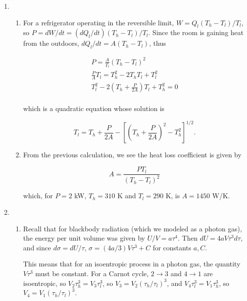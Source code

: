 \documentclass{article}
\begin{document}
\begin{enumerate}
\begin{enumerate}
	\end{enumerate}

	\item

	\begin{enumerate}

		\item

		For a refrigerator operating in the reversible limit, $W = Q_l (T_h - T_l)/T_l$, so $P = dW/dt = (dQ_l/dt) (T_h - T_l)/T_l$. Since the room is gaining heat from the outdoors, $dQ_l/dt = A(T_h - T_l)$, thus

		\begin{gather*}
		P = \frac{A}{T_l} (T_h-T_l)^2 \\
		\frac{P}{A}T_l = T_h^2 - 2T_h T_l + T_l^2 \\
		T_l^2 - 2 \left( T_h + \frac{P}{2A} \right)T_l + T_h^2 = 0 \\
		\end{gather*}

		which is a quadratic equation whose solution is

		$$T_l = T_h + \frac{P}{2A} - \left[ \left(T_h + \frac{P}{2A} \right)^2 - T_h^2 \right]^{1/2}.$$

		\item

		From the previous calculation, we see the heat loss coefficient is given by

		$$A = \frac{P T_l}{(T_h - T_l)^2}$$

		which, for $P = 2$ kW, $T_h = 310$ K and $T_l = 290$ K, is $A = 1450$ W/K.

	\end{enumerate}

	\item

	\begin{enumerate}

		\item

		Recall that for blackbody radiation (which we modeled as a photon gas), the energy per unit volume was given by $U/V = a \tau^4$. Then $dU = 4aV \tau^3 d\tau$, and since $d \sigma = dU / \tau$, $\sigma = (4a/3) V\tau^3 + C$ for constants $a, C$.

		This means that for an isoentropic process in a photon gas, the quantity $V\tau^3$ must be constant. For a Carnot cycle, $2 \to 3$ and $4 \to 1$ are isoentropic, so $V_2 \tau_h^3 = V_3 \tau_l^3$, so $V_3 = V_2 (\tau_h / \tau_l)^3$, and $V_4 \tau_l^3 = V_1 \tau_h^3$, so $V_4 = V_1 (\tau_h / \tau_l)^3$.


\end{enumerate}
\end{enumerate}
\end{document}
